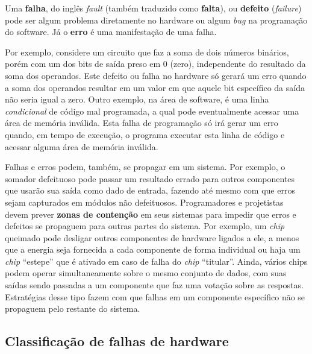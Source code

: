 Uma \textbf{falha}, do inglês \emph{fault} (também traduzido como \textbf{falta}), ou \textbf{defeito} (\emph{failure}) pode ser algum problema diretamente no hardware ou algum \emph{bug} na programação do software. Já o \textbf{erro} é uma manifestação de uma falha.

Por exemplo, considere um circuito que faz a soma de dois números binários, porém com um dos bits de saída preso em $0$ (zero), independente do resultado da soma dos operandos. Este defeito ou falha no hardware só gerará um erro quando a soma dos operandos resultar em um valor em que aquele bit específico da saída não seria igual a zero. Outro exemplo, na área de software, é uma linha \emph{condicional} de código mal programada, a qual pode eventualmente acessar uma área de memória inválida. Esta falha de programação só irá gerar um erro quando, em tempo de execução, o programa executar esta linha de código e acessar alguma área de memória inválida.

Falhas e erros podem, também, se propagar em um sistema. Por exemplo, o somador defeituoso pode passar um resultado errado para outros componentes que usarão sua saída como dado de entrada, fazendo até mesmo com que erros sejam capturados em módulos não defeituosos. Programadores e projetistas devem prever \textbf{zonas de contenção} em seus sistemas para impedir que erros e defeitos se propaguem para outras partes do sistema. Por exemplo, um \emph{chip} queimado pode desligar outros componentes de hardware ligados a ele, a menos que a energia seja fornecida a cada componente de forma individual ou haja um \emph{chip} ``estepe'' que é ativado em caso de falha do \emph{chip} ``titular''. Ainda, vários chips podem operar simultaneamente sobre o mesmo conjunto de dados, com suas saídas sendo passadas a um componente que faz uma votação sobre as respostas. Estratégias desse tipo fazem com que falhas em um componente específico não se propaguem pelo restante do sistema.


\subsection{Classificação de falhas de hardware} %
\label{sub:classificacao}

